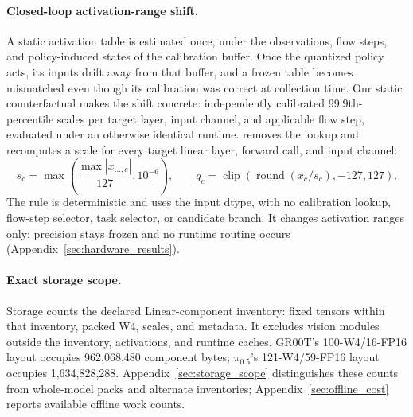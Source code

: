 \paragraph{Closed-loop activation-range shift.}
A static activation table is estimated once, under the observations, flow steps, and policy-induced states of the calibration buffer. Once the quantized policy acts, its inputs drift away from that buffer, and a frozen table becomes mismatched even though its calibration was correct at collection time. Our static counterfactual makes the shift concrete: independently calibrated 99.9th-percentile scales per target layer, input channel, and applicable flow step, evaluated under an otherwise identical runtime. \dyrange removes the lookup and recomputes a scale for every target linear layer, forward call, and input channel:
\begin{equation}
 s_c=\max\!\left(\frac{\max |x_{\ldots,c}|}{127},10^{-6}\right),
 \qquad q_c=\operatorname{clip}\!\left(\operatorname{round}(x_c/s_c),-127,127\right).
 \label{eq:dyrange}
\end{equation}
The rule is deterministic and uses the input dtype, with no calibration lookup, flow-step selector, task selector, or candidate branch. It changes activation ranges only: precision stays frozen and no runtime routing occurs (Appendix~\ref{sec:hardware_results}).

\paragraph{Exact storage scope.}
Storage counts the declared Linear-component inventory: fixed tensors within that inventory, packed W4, scales, and metadata. It excludes vision modules outside the inventory, activations, and runtime caches. GR00T's 100-W4/16-FP16 layout occupies 962,068,480 component bytes; $\pi_{0.5}$'s 121-W4/59-FP16 layout occupies 1,634,828,288. Appendix~\ref{sec:storage_scope} distinguishes these counts from whole-model packs and alternate inventories; Appendix~\ref{sec:offline_cost} reports available offline work counts.
